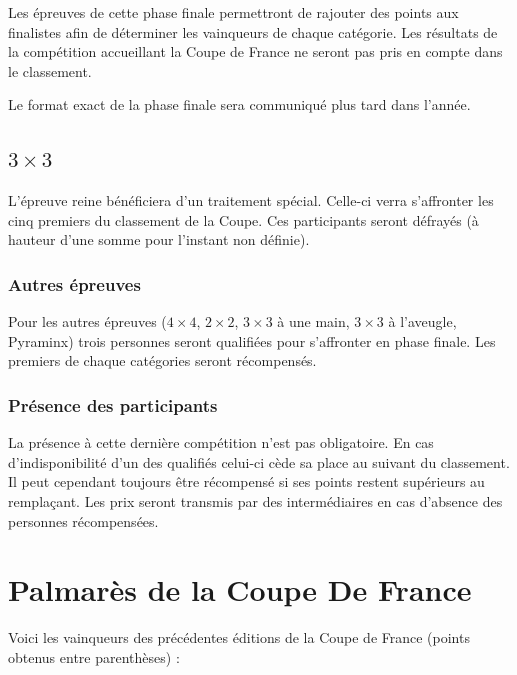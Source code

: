 \documentclass[10pt,a4paper]{article}
\newcommand{\3}{$3\times3$}
\newcommand{\4}{$4\times4$}
\newcommand{\2}{$2\times2$}
\newcommand{\oh}{$3\times3$ à une main}
\newcommand{\bld}{$3\times3$ à l'aveugle}
\newcommand{\pyra}{Pyraminx}
\begin{document}
Les épreuves de cette phase finale permettront de rajouter des points aux finalistes afin de déterminer les vainqueurs de chaque catégorie.
Les résultats de la compétition accueillant la Coupe de France ne seront pas pris en compte dans le classement.

Le format exact de la phase finale sera communiqué plus tard dans l'année.


\subsection{\3}

L'épreuve reine bénéficiera d'un traitement spécial. Celle-ci verra s'affronter les cinq premiers du classement de la Coupe. Ces participants seront défrayés (à hauteur d'une somme pour l'instant non définie).


\subsubsection{Autres épreuves}

Pour les autres épreuves (\4, \2, \oh, \bld, \pyra) trois personnes seront qualifiées pour s'affronter en phase finale. Les premiers de chaque catégories seront récompensés.


\subsubsection{Présence des participants}

La présence à cette dernière compétition n'est pas obligatoire. En cas d'indisponibilité d'un des qualifiés celui-ci cède sa place au suivant du classement. Il peut cependant toujours être récompensé si ses points restent supérieurs au remplaçant. Les prix seront transmis par des intermédiaires en cas d'absence des personnes récompensées.


\section{Palmarès de la Coupe De France}

Voici les vainqueurs des précédentes éditions de la Coupe de France (points obtenus entre parenthèses) :
\end{document}
